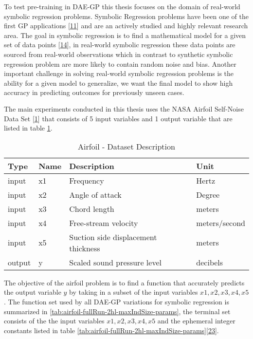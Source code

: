 \documentclass[
  11pt,
]{article}
\begin{document}
To test pre-training in DAE-GP this thesis focuses on the domain of real-world symbolic regression problems. Symbolic Regression problems have been one of the first GP applications {[}\protect\hyperlink{ref-Koza1993GeneticP}{11}{]} and are an actively studied and highly relevant research area. The goal in symbolic regression is to find a mathematical model for a given set of data points {[}\protect\hyperlink{ref-10.1007ux2f978-3-540-24621-3_22}{14}{]}, in real-world symbolic regression these data points are sourced from real-world observations which in contrast to synthetic symbolic regression problem are more likely to contain random noise and bias. Another important challenge in solving real-world symbolic regression problems is the ability for a given model to generalize, we want the final model to show high accuracy in predicting outcomes for previously unseen cases.

The main experiments conducted in this thesis uses the NASA Airfoil Self-Noise Data Set {[}\protect\hyperlink{ref-AIRFOIL_DATASET}{1}{]} that consists of 5 input variables and 1 output variable that are listed in table \ref{tab:airfoil-dataset-description}.

\begin{table}[!h]

\caption{\label{tab:airfoil-dataset-description}Airfoil - Dataset Description}
\centering
\begin{tabular}[t]{l|l|l|l}
\hline
\textbf{Type} & \textbf{Name} & \textbf{Description} & \textbf{Unit}\\
\hline
input & x1 & Frequency & Hertz\\
\hline
input & x2 & Angle of attack & Degree\\
\hline
input & x3 & Chord length & meters\\
\hline
input & x4 & Free-stream velocity & meters/second\\
\hline
input & x5 & Suction side displacement thickness & meters\\
\hline
output & y & Scaled sound pressure level & decibels\\
\hline
\end{tabular}
\end{table}

The objective of the airfoil problem is to find a function that accurately predicts the output variable \(y\) by taking in a subset of the input variables \(x1,x2,x3,x4,x5\). The function set used by all DAE-GP variations for symbolic regression is summarized in \ref{tab:airfoil-fullRun-2hl-maxIndSize-params}, the terminal set consists of the the input variables \(x1,x2,x3,x4,x5\) and the ephemeral integer constants listed in table \ref{tab:airfoil-fullRun-2hl-maxIndSize-params}{[}\protect\hyperlink{ref-dae-gp_2022_symreg}{23}{]}.
\end{document}
